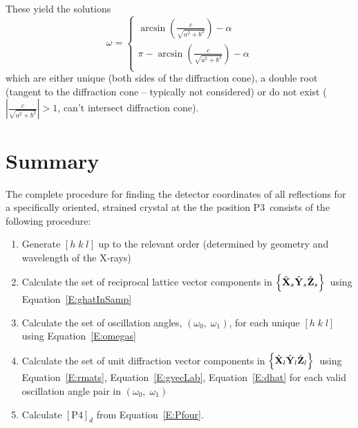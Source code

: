 \documentclass[12pt,letterpaper,final]{amsart}
\newcommand{\mbm}[1]{\ensuremath{\mbox{\boldmath$#1$}}}
\newcommand{\Pthree}{\ensuremath{\mathrm{P3}}}
\newcommand{\Pfour}{\ensuremath{\mathrm{P4}}}
\newcommand{\Xl}{\ensuremath{\hat{\mbm{\mathrm{X}}}_l}}
\newcommand{\Yl}{\ensuremath{\hat{\mbm{\mathrm{Y}}}_l}}
\newcommand{\Zl}{\ensuremath{\hat{\mbm{\mathrm{Z}}}_l}}
\newcommand{\labframe}{\ensuremath{\left\{\Xl\Yl\Zl\right\}}}
\newcommand{\Xs}{\ensuremath{\hat{\mbm{\mathrm{X}}}_s}}
\newcommand{\Ys}{\ensuremath{\hat{\mbm{\mathrm{Y}}}_s}}
\newcommand{\Zs}{\ensuremath{\hat{\mbm{\mathrm{Z}}}_s}}
\newcommand{\sampframe}{\ensuremath{\left\{\Xs\Ys\Zs\right\}}}
\newcommand{\detcomps}[1]{\left[#1\right]_d}
\newcommand{\eqnref}[1]{Equation~\ref{#1}}
\newcommand{\xrays}{X-rays}
\begin{document}
These yield the solutions
\begin{equation}
    \omega = \left\{
        \begin{array}{r} 
            \arcsin{ \left( \frac{c}{\sqrt{a^2 + b^2}} \right) } - \alpha \\ 
            \pi - \arcsin{ \left(\frac{c}{\sqrt{a^2 + b^2}}\right) } - \alpha \\
        \end{array}
    \right. \label{E:omegas}
\end{equation}
which are either unique (both sides of the diffraction cone), a double root (tangent to the diffraction cone -- typically not considered) or do not exist ($|\frac{c}{\sqrt{a^2 + b^2}}| > 1$, can't intersect diffraction cone).

\section{Summary}\label{S:summary}
The complete procedure for finding the detector coordinates of all reflections for a specifically oriented, strained crystal at the the position \Pthree\ consists of the following procedure:
\begin{enumerate}
\item Generate $[h\; k\; l]$ up to the relevant order (determined by geometry and wavelength of the \xrays) \\
\item Calculate the set of reciprocal lattice vector components in \sampframe\ using \eqnref{E:ghatInSamp} \\
\item Calculate the set of oscillation angles, $(\omega_0,\; \omega_1)$, for each unique $[h\; k\; l]$ using \eqnref{E:omegas}\\
\item Calculate the set of unit diffraction vector components in \labframe\ using \eqnref{E:rmats}, \eqnref{E:gvecLab}, \eqnref{E:dhat} for each valid oscillation angle pair in $(\omega_0,\; \omega_1)$\\
\item Calculate $\detcomps{\Pfour}$ from \eqnref{E:Pfour}.
\end{enumerate}
\end{document}
